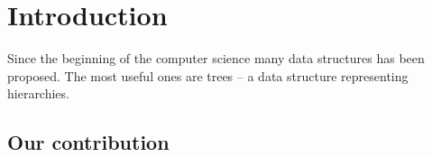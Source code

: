\chapter*{Introduction}

Since the beginning of the computer science many data structures has been proposed.
The most useful ones are trees -- a data structure representing hierarchies.



\section{Our contribution}

